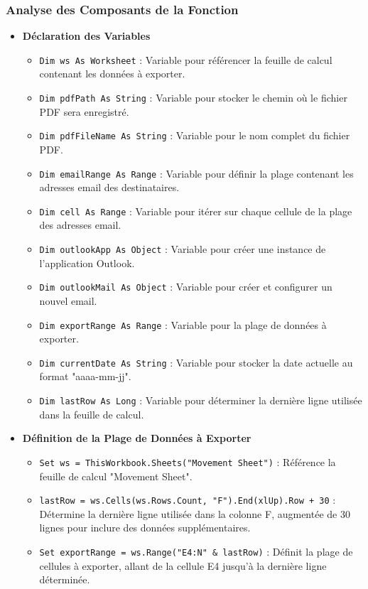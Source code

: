 \documentclass[a4paper, oneside, 12pt, final]{extreport}
\begin{document}
\subsubsection{Analyse des Composants de la Fonction}
\begin{itemize}

\item\textbf{Déclaration des Variables}

\begin{itemize}
    \item \texttt{Dim ws As Worksheet} : Variable pour référencer la feuille de calcul contenant les données à exporter.
    \item \texttt{Dim pdfPath As String} : Variable pour stocker le chemin où le fichier PDF sera enregistré.
    \item \texttt{Dim pdfFileName As String} : Variable pour le nom complet du fichier PDF.
    \item \texttt{Dim emailRange As Range} : Variable pour définir la plage contenant les adresses email des destinataires.
    \item \texttt{Dim cell As Range} : Variable pour itérer sur chaque cellule de la plage des adresses email.
    \item \texttt{Dim outlookApp As Object} : Variable pour créer une instance de l'application Outlook.
    \item \texttt{Dim outlookMail As Object} : Variable pour créer et configurer un nouvel email.
    \item \texttt{Dim exportRange As Range} : Variable pour la plage de données à exporter.
    \item \texttt{Dim currentDate As String} : Variable pour stocker la date actuelle au format "aaaa-mm-jj".
    \item \texttt{Dim lastRow As Long} : Variable pour déterminer la dernière ligne utilisée dans la feuille de calcul.
\end{itemize}

\item\textbf{Définition de la Plage de Données à Exporter}

\begin{itemize}
    \item \texttt{Set ws = ThisWorkbook.Sheets("Movement Sheet")} : Référence la feuille de calcul "Movement Sheet".
    \item \texttt{lastRow = ws.Cells(ws.Rows.Count, "F").End(xlUp).Row + 30} : Détermine la dernière ligne utilisée dans la colonne F, augmentée de 30 lignes pour inclure des données supplémentaires.
    \item \texttt{Set exportRange = ws.Range("E4:N" \& lastRow)} : Définit la plage de cellules à exporter, allant de la cellule E4 jusqu'à la dernière ligne déterminée.
\end{itemize}


\end{itemize}
\end{document}
